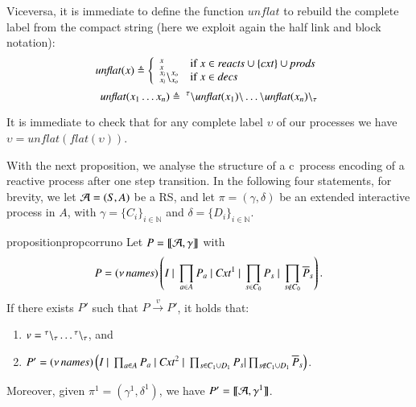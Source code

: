 Viceversa, it is immediate to define the function $\mathit{unflat}$ to rebuild the complete label from the compact string (here we exploit again the half link and block notation):
$$
\mathit{unflat}(x) \triangleq\left\{
\begin{array}{ll}
^{x}_{x} & \mbox{if $x\in \mathit{reacts}\cup\{\mathit{cxt}\}\cup\mathit{prods}$}\\
^{x_i}_{x_i}\backslash^{x_o}_{x_o} & \mbox{if $x\in \mathit{decs}$}\\
\end{array}
\right.
$$
$$
\mathit{unflat}(x_1\dots x_n) \triangleq\ ^{\tau}\backslash \mathit{unflat}(x_1) \backslash \dots \backslash \mathit{unflat}(x_n) \backslash_{\tau}
$$

It is immediate to check that for any complete label $\upsilon$ of our processes we have
$\upsilon = \mathit{unflat}(\mathit{flat}(\upsilon))$.


With the next proposition, we analyse the structure of a c\CNA \ 
process encoding of  a reactive process after one step transition.
In the following four statements, for brevity, we let ${\cal A} = (S, A)$ be a RS, and let  $\pi=(\gamma,\delta)$ be an extended interactive process in $A$, with $\gamma=\{C_i\}_{i\in\mathbb{N}}$ and $\delta=\{D_i\}_{i\in\mathbb{N}}$. 

 \begin{restatable}[Correctness 1]{proposition}{propcorruno}
 \label{prop:corr1}
 Let 
 $P=\llbracket{\cal A},\gamma\rrbracket$ with
$$P  = (\nu\, \mathit{names}) \left(I~|~\prod_{a \in A}P_a ~|~ \mathit{Cxt}^1 ~|~ \prod_{s \in C_0}P_s ~|~ \prod_{s \notin C_0}\overline{P}_s\right).
$$
 If there exists  $P'$  such that $P \xrightarrow{v}P'$,  it holds that:
 \begin{enumerate}
 \item
  $v={}^{\tau} \backslash_{\tau}\dots{}^{\tau} \backslash_{\tau}$, and
  \item 
 $P'= (\nu\, \mathit{names}) \left(I~|~\prod_{a \in A}P_a~|~ \mathit{Cxt}^2 ~|~ \prod_{s \in C_1 \cup D_1}P_s| \prod_{s \notin C_1 \cup D_1}\overline{P}_s\right)$.
 \end{enumerate}
Moreover, given $\pi^1=(\gamma^1,\delta^1)$, we have $P' = \llbracket {\cal A},\gamma^1\rrbracket$.
\end{restatable}
 
